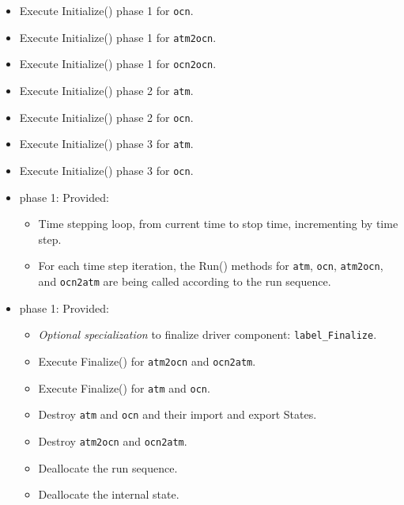 \begin{itemize}
\begin{itemize}
  \item Execute Initialize() phase 1 for {\tt ocn}.
  \item Execute Initialize() phase 1 for {\tt atm2ocn}.
  \item Execute Initialize() phase 1 for {\tt ocn2ocn}.
  \item Execute Initialize() phase 2 for {\tt atm}.
  \item Execute Initialize() phase 2 for {\tt ocn}.
  \item Execute Initialize() phase 3 for {\tt atm}.
  \item Execute Initialize() phase 3 for {\tt ocn}.
  \end{itemize}  
\end{itemize}

\begin{itemize}
\item phase 1: {\sc Provided:}
  \begin{itemize}
  \item Time stepping loop, from current time to stop time, incrementing by time step.
  \item For each time step iteration, the Run() methods for {\tt atm}, {\tt ocn}, {\tt atm2ocn}, and {\tt ocn2atm} are being called according to the run sequence.
  \end{itemize}    
\end{itemize}

\begin{itemize}
\item phase 1: {\sc Provided:}
  \begin{itemize}
  \item {\it Optional specialization} to finalize driver component: {\tt label\_Finalize}.
  \item Execute Finalize() for {\tt atm2ocn} and {\tt ocn2atm}.
  \item Execute Finalize() for {\tt atm} and {\tt ocn}.
  \item Destroy {\tt atm} and {\tt ocn} and their import and export States.
  \item Destroy {\tt atm2ocn} and {\tt ocn2atm}.
  \item Deallocate the run sequence.
  \item Deallocate the internal state.
  \end{itemize}      
\end{itemize}

